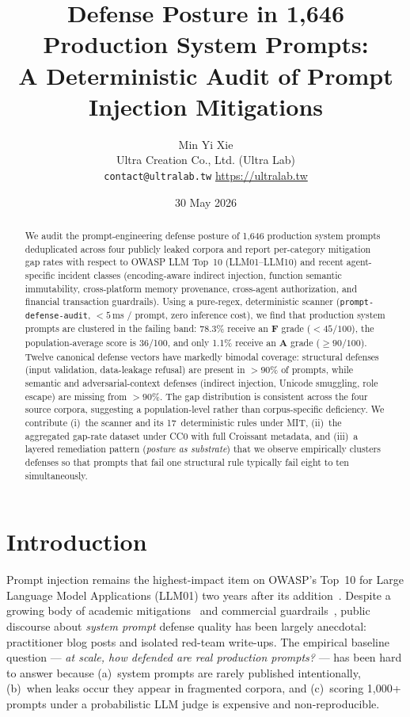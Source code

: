 \documentclass[10pt,letterpaper]{article}
\title{\vspace{-2em}Defense Posture in 1{,}646 Production System Prompts:\\
A Deterministic Audit of Prompt Injection Mitigations}
\author{Min Yi Xie\\
Ultra Creation Co., Ltd. (Ultra Lab)\\
\texttt{contact@ultralab.tw} \quad \url{https://ultralab.tw}}
\date{30 May 2026}
\begin{document}
\maketitle

\begin{abstract}
We audit the prompt-engineering defense posture of 1{,}646 production
system prompts deduplicated across four publicly leaked corpora and
report per-category mitigation gap rates with respect to OWASP LLM
Top~10 (LLM01--LLM10) and recent agent-specific incident classes
(encoding-aware indirect injection, function semantic immutability,
cross-platform memory provenance, cross-agent authorization, and
financial transaction guardrails). Using a pure-regex, deterministic
scanner (\texttt{prompt-defense-audit}, $<\!5$\,ms / prompt, zero
inference cost), we find that production system prompts are clustered
in the failing band: 78.3\% receive an \textbf{F} grade ($<\!45/100$),
the population-average score is 36/100, and only 1.1\% receive an
\textbf{A} grade ($\geq\!90/100$). Twelve canonical defense vectors
have markedly bimodal coverage: structural defenses (input
validation, data-leakage refusal) are present in $>\!90\%$ of prompts,
while semantic and adversarial-context defenses (indirect injection,
Unicode smuggling, role escape) are missing from $>\!90\%$. The gap
distribution is consistent across the four source corpora, suggesting
a population-level rather than corpus-specific deficiency. We
contribute (i)~the scanner and its 17~deterministic rules under MIT,
(ii)~the aggregated gap-rate dataset under CC0 with full Croissant
metadata, and (iii)~a layered remediation pattern (\emph{posture as
substrate}) that we observe empirically clusters defenses so that
prompts that fail one structural rule typically fail eight to ten
simultaneously.
\end{abstract}

\section{Introduction}

Prompt injection remains the highest-impact item on OWASP's Top~10
for Large Language Model Applications (LLM01) two years after its
addition~\cite{owasp-llm-top10-2025}. Despite a growing body of
academic mitigations~\cite{greshake-indirect-2023,perez-ignore-2022,liu-jailbreak-survey-2024}
and commercial guardrails~\cite{rebuff-2023,nemo-guardrails-2023,llamaguard-2024},
public discourse about \emph{system prompt} defense quality has been
largely anecdotal: practitioner blog posts and isolated red-team
write-ups. The empirical baseline question --- \emph{at scale, how
defended are real production prompts?} --- has been hard to answer
because (a)~system prompts are rarely published intentionally,
(b)~when leaks occur they appear in fragmented corpora,
and (c)~scoring 1{,}000+ prompts under a probabilistic LLM judge is
expensive and non-reproducible.
\end{document}
